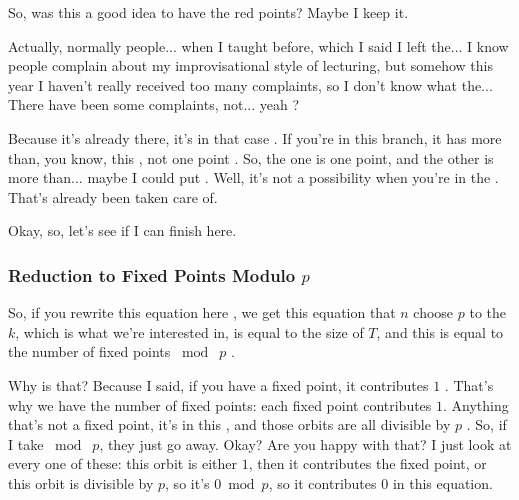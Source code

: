 \begin{proofWrapper}
\begin{hidden}
\end{hidden}

\begin{speech}[00:57:08 - 00:58:20]
So, was this a good idea to have the red points? Maybe I keep it.

Actually, normally people... when I taught before, which I said I left the... I know people complain about my improvisational style of lecturing, but somehow this year I haven't really received too many complaints, so I don't know what the... There have been some complaints, not... yeah ?

Because it's already there, it's in that case . If you're in this branch, it has more than, you know, this , not one point . So, the one is one point, and the other is more than... maybe I could put  .  Well, it's not a possibility when you're in the . That's already been taken care of.

Okay, so, let's see if I can finish here.
\end{speech}

\subsubsection{Reduction to Fixed Points Modulo \texorpdfstring{$p$}{p}}

\begin{speech}[00:58:20 - 00:59:55]
So, if you rewrite this equation here , we get this equation that $n$ choose $p$ to the $k$, which is what we're interested in, is equal to the size of $T$, and this is equal to the number of fixed points $\bmod\; p$ .

Why is that? Because I said, if you have a fixed point, it contributes $1$ . That's why we have the number of fixed points: each fixed point contributes $1$. Anything that's not a fixed point, it's in this , and those orbits are all divisible by $p$ . So, if I take $\bmod\; p$, they just go away. Okay? Are you happy with that? I just look at every one of these: this orbit is either $1$, then it contributes the fixed point, or this orbit is divisible by $p$, so it's $0 \bmod p$, so it contributes $0$ in this equation.


\end{speech}
\end{proofWrapper}
